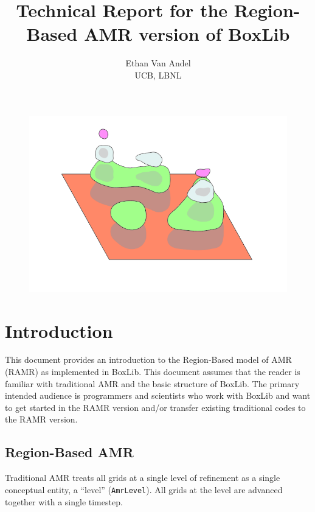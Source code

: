 \documentclass[11pt]{article}
\newcommand{\AL}{{\tt AmrLevel}}
\begin{document}
\title{Technical Report for the Region-Based AMR version of BoxLib}
\author{Ethan Van Andel \\ UCB, LBNL}

\maketitle

\begin{figure}[h]
\centering
\includegraphics[width=\textwidth]{regions-logo.png}

\end{figure}

\newpage
\tableofcontents
\newpage

\section{Introduction}

This document provides an introduction to the Region-Based model of 
AMR (RAMR) 
as implemented in BoxLib. This document assumes that the reader is 
familiar with traditional AMR and the basic structure of BoxLib. The 
primary intended audience is programmers and scientists who work with 
BoxLib and want to get started in the RAMR version and/or 
transfer existing traditional codes to the RAMR version.

\subsection{Region-Based AMR}
Traditional AMR treats all grids at a single level of refinement as a 
single conceptual entity, a ``level'' (\AL{}). All grids at the level are 
advanced together with a single timestep. 
\end{document}
